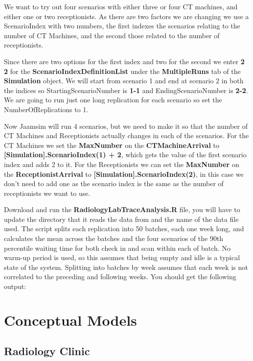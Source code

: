 \documentclass[
  10pt,
  a4paperpaper,
  DIV=11,
  numbers=noendperiod,
  oneside]{scrreprt}
\begin{document}
We want to try out four scenarios with either three or four CT machines,
and either one or two receptionists. As there are two factors we are
changing we use a ScenarioIndex with two numbers, the first indexes the
scenarios relating to the number of CT Machines, and the second those
related to the number of receptionists.

Since there are two options for the first index and two for the second
we enter \textbf{2 2} for the \textbf{ScenarioIndexDefinitionList} under
the \textbf{MultipleRuns} tab of the \textbf{Simulation} object. We will
start from scenario 1 and end at scenario 2 in both the indices so
StartingScenarioNumber is \textbf{1-1} and EndingScenarioNumber is
\textbf{2-2}. We are going to run just one long replication for each
scenario so set the NumberOfReplications to 1.

Now Jaamsim will run 4 scenarios, but we need to make it so that the
number of CT Machines and Receptionists actually changes in each of the
scenarios. For the CT Machines we set the \textbf{MaxNumber} on the
\textbf{CTMachineArrival} to \textbf{{[}Simulation{]}.ScenarioIndex(1) +
2}, which gets the value of the first scenario index and adds 2 to it.
For the Receptionists we can set the \textbf{MaxNumber} on the
\textbf{ReceptionistArrival} to
\textbf{{[}Simulation{]}.ScenarioIndex(2)}, in this case we don't need
to add one as the scenario index is the same as the number of
receptionists we want to use.

Download and run the \textbf{RadiologyLabTraceAnalysis.R} file, you will
have to update the directory that it reads the data from and the name of
the data file used. The script splits each replication into 50 batches,
each one week long, and calculates the mean across the batches and the
four scenarios of the 90th percentile waiting time for both check in and
scan within each of batch. No warm-up period is used, so this assumes
that being empty and idle is a typical state of the system. Splitting
into batches by week assumes that each week is not correlated to the
preceding and following weeks. You should get the following output:

\part{Conceptual Models}

\chapter{Radiology Clinic}\label{sec-radiology_cm}
\end{document}
